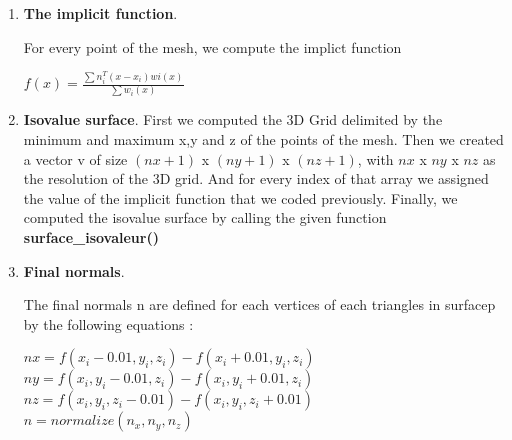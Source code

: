 \documentclass[11pt,a4paper]{article}
\begin{document}
\begin{enumerate}
\item \textbf{The implicit function}.

For every point of the mesh, we compute the implict function
\begin{center}
 $ f(x) = \frac{\sum{}{} n_{i}^T (x-x_{i}) wi(x)}{\sum{}{} w_{i}(x)} $
 \end{center} 


\item \textbf{Isovalue surface}.
First we computed the 3D Grid delimited by the minimum and maximum x,y and z of the points of the mesh.
Then we created a vector v of size $(nx + 1)$ x $(ny + 1)$ x $(nz +1)$, with $nx$ x $ny$ x $nz$ as the resolution of the 3D grid. And for every index of that array we assigned the value of the implicit function that we coded previously.
Finally, we computed the isovalue surface by calling the given function \textbf{surface\_isovaleur()}


\item \textbf{Final normals}.

The final normals n are defined for each vertices of each triangles in surfacep by the following equations :

\begin{center}
 $ nx = f(x_{i} - 0.01, y_{i},z_{i}) - f(x_{i} + 0.01, y_{i},z_{i}) $\\
 $ ny = f(x_{i} , y_{i} - 0.01,z_{i}) - f(x_{i}, y_{i}  + 0.01 ,z_{i}) $\\
 $ nz = f(x_{i} , y_{i},z_{i} - 0.01) - f(x_{i} , y_{i},z_{i} + 0.01) $\\
 $n = normalize( n_{x} , n_{y}, n_{z})$
 
 \end{center} 

\end{enumerate}
\end{document}
